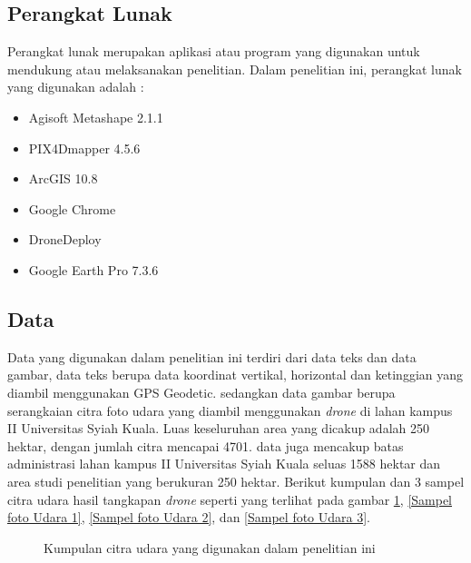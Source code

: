 \subsection{Perangkat Lunak}

Perangkat lunak merupakan aplikasi atau program yang digunakan untuk mendukung atau melaksanakan penelitian. Dalam penelitian ini, perangkat lunak yang digunakan adalah :

\begin{itemize}
	\item Agisoft Metashape 2.1.1
    \item PIX4Dmapper 4.5.6
    \item ArcGIS 10.8
    \item Google Chrome
    \item DroneDeploy
    \item Google Earth Pro 7.3.6
	\end{itemize}

\subsection{Data}

Data yang digunakan dalam penelitian ini terdiri dari data teks dan data gambar, data teks berupa data koordinat vertikal, horizontal dan ketinggian yang diambil menggunakan GPS Geodetic. sedangkan data gambar berupa serangkaian citra foto udara yang diambil menggunakan \textit{drone} di lahan kampus II Universitas Syiah Kuala. Luas keseluruhan area yang dicakup adalah 250 hektar, dengan jumlah citra mencapai 4701. data juga mencakup batas administrasi lahan kampus II Universitas Syiah Kuala seluas 1588 hektar dan area studi penelitian yang berukuran 250 hektar. Berikut kumpulan dan 3 sampel citra udara hasil tangkapan \textit{drone} seperti yang terlihat pada gambar \ref{citra udara}, \ref{Sampel foto Udara 1}, \ref{Sampel foto Udara 2}, dan \ref{Sampel foto Udara 3}.

\begin{figure}[H]
	\centering
	\caption{Kumpulan citra udara yang digunakan dalam penelitian ini}
	\label{citra udara} %
\end{figure}

